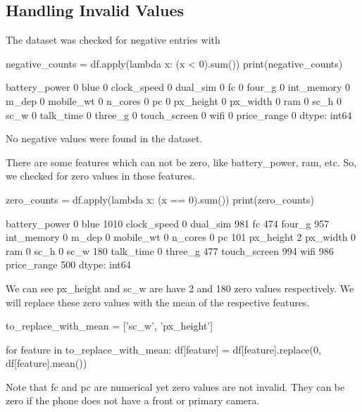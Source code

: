 \documentclass[12pt]{report}
\begin{document}
\subsection{Handling Invalid Values}
The dataset was checked for negative entries with
\begin{python}
negative_counts = df.apply(lambda x: (x < 0).sum())
print(negative_counts)
\end{python}
\begin{python}
battery_power    0
blue             0
clock_speed      0
dual_sim         0
fc               0
four_g           0
int_memory       0
m_dep            0
mobile_wt        0
n_cores          0
pc               0
px_height        0
px_width         0
ram              0
sc_h             0
sc_w             0
talk_time        0
three_g          0
touch_screen     0
wifi             0
price_range      0
dtype: int64
\end{python}
No negative values were found in the dataset.

\noindent There are some features which can not be zero, like battery\_power, ram, etc. So, we checked for zero values in these features.
\begin{python}
zero_counts = df.apply(lambda x: (x == 0).sum())
print(zero_counts)
\end{python}
\begin{python}
battery_power       0
blue             1010
clock_speed         0
dual_sim          981
fc                474
four_g            957
int_memory          0
m_dep               0
mobile_wt           0
n_cores             0
pc                101
px_height           2
px_width            0
ram                 0
sc_h                0
sc_w              180
talk_time           0
three_g           477
touch_screen      994
wifi              986
price_range       500
dtype: int64
\end{python}
We can see px\_height and sc\_w are have 2 and 180 zero values respectively. We will replace these zero values with the mean of the respective features.
\begin{python}
to_replace_with_mean = ['sc_w', 'px_height']

for feature in to_replace_with_mean:
	df[feature] = df[feature].replace(0, df[feature].mean())
\end{python}
Note that fc and pc are numerical yet zero values are not invalid. They can be zero if the phone does not have a front or primary camera.
\end{document}
